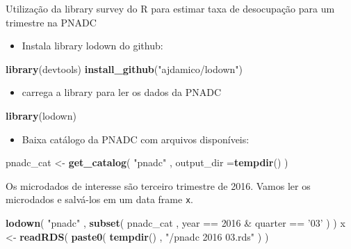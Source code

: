 \documentclass[]{book}
\newenvironment{Shaded}{\begin{snugshade}}{\end{snugshade}}
\newcommand{\KeywordTok}[1]{\textcolor[rgb]{0.13,0.29,0.53}{\textbf{{#1}}}}
\newcommand{\DataTypeTok}[1]{\textcolor[rgb]{0.13,0.29,0.53}{{#1}}}
\newcommand{\DecValTok}[1]{\textcolor[rgb]{0.00,0.00,0.81}{{#1}}}
\newcommand{\StringTok}[1]{\textcolor[rgb]{0.31,0.60,0.02}{{#1}}}
\newcommand{\NormalTok}[1]{{#1}}
\providecommand{\tightlist}{%
  \setlength{\itemsep}{0pt}\setlength{\parskip}{0pt}}
\numberwithin{example}{chapter}
\numberwithin{remark}{chapter}
\numberwithin{definition}{chapter}
\let\BeginKnitrBlock\begin \let\EndKnitrBlock\end
\begin{document}
\BeginKnitrBlock{example}
\protect\hypertarget{ex:unnamed-chunk-14}{}{\label{ex:unnamed-chunk-14}}Utilização
da library survey do R para estimar taxa de desocupação para um
trimestre na PNADC
\EndKnitrBlock{example}

\begin{itemize}
\tightlist
\item
  Instala library lodown do github:
\end{itemize}

\begin{Shaded}
\begin{Highlighting}[]
\KeywordTok{library}\NormalTok{(devtools)}
\KeywordTok{install_github}\NormalTok{(}\StringTok{"ajdamico/lodown"}\NormalTok{)}
\end{Highlighting}
\end{Shaded}

\begin{itemize}
\tightlist
\item
  carrega a library para ler os dados da PNADC
\end{itemize}

\begin{Shaded}
\begin{Highlighting}[]
\KeywordTok{library}\NormalTok{(lodown)}
\end{Highlighting}
\end{Shaded}

\begin{itemize}
\tightlist
\item
  Baixa catálogo da PNADC com arquivos disponíveis:
\end{itemize}

\begin{Shaded}
\begin{Highlighting}[]
\NormalTok{pnadc_cat <-}\StringTok{ }\KeywordTok{get_catalog}\NormalTok{( }\StringTok{"pnadc"} \NormalTok{, }\DataTypeTok{output_dir =}\KeywordTok{tempdir}\NormalTok{() )}
\end{Highlighting}
\end{Shaded}

Os microdados de interesse são terceiro trimestre de 2016. Vamos ler os
microdados e salvá-los em um data frame \texttt{x}.

\begin{Shaded}
\begin{Highlighting}[]
\KeywordTok{lodown}\NormalTok{( }\StringTok{"pnadc"} \NormalTok{, }\KeywordTok{subset}\NormalTok{( pnadc_cat , year ==}\StringTok{ }\DecValTok{2016} \NormalTok{&}\StringTok{ }\NormalTok{quarter ==}\StringTok{ '03'} \NormalTok{) )}
\NormalTok{x <-}\StringTok{ }\KeywordTok{readRDS}\NormalTok{( }\KeywordTok{paste0}\NormalTok{( }\KeywordTok{tempdir}\NormalTok{() , }\StringTok{"/pnadc 2016 03.rds"} \NormalTok{) )}
\end{Highlighting}
\end{Shaded}
\end{document}
